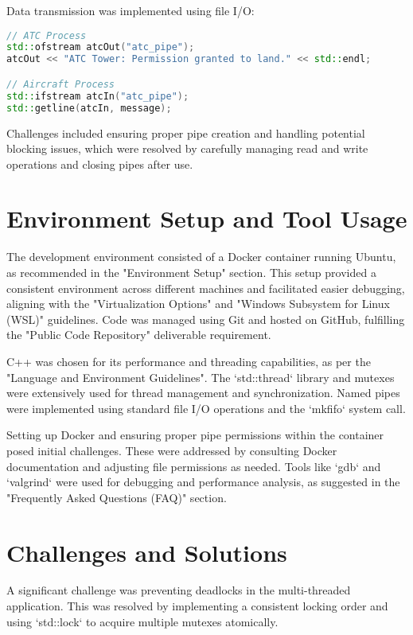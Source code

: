 \documentclass{article}
\begin{document}
Data transmission was implemented using file I/O:

\begin{lstlisting}[language=C++, caption={Data Transmission}, label={lst:data_transmit}]
// ATC Process
std::ofstream atcOut("atc_pipe");
atcOut << "ATC Tower: Permission granted to land." << std::endl;

// Aircraft Process
std::ifstream atcIn("atc_pipe");
std::getline(atcIn, message);
\end{lstlisting}

Challenges included ensuring proper pipe creation and handling potential blocking issues, which were resolved by carefully managing read and write operations and closing pipes after use.

\section{Environment Setup and Tool Usage}
The development environment consisted of a Docker container running Ubuntu, as recommended in the "Environment Setup" section. This setup provided a consistent environment across different machines and facilitated easier debugging, aligning with the "Virtualization Options" and "Windows Subsystem for Linux (WSL)" guidelines. Code was managed using Git and hosted on GitHub, fulfilling the "Public Code Repository" deliverable requirement.

C++ was chosen for its performance and threading capabilities, as per the "Language and Environment Guidelines". The `std::thread` library and mutexes were extensively used for thread management and synchronization. Named pipes were implemented using standard file I/O operations and the `mkfifo` system call.

Setting up Docker and ensuring proper pipe permissions within the container posed initial challenges. These were addressed by consulting Docker documentation and adjusting file permissions as needed. Tools like `gdb` and `valgrind` were used for debugging and performance analysis, as suggested in the "Frequently Asked Questions (FAQ)" section.

\section{Challenges and Solutions}
A significant challenge was preventing deadlocks in the multi-threaded application. This was resolved by implementing a consistent locking order and using `std::lock` to acquire multiple mutexes atomically.
\end{document}
